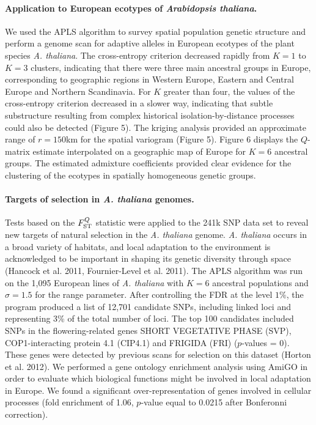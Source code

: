  
\paragraph{Application to European ecotypes of {\it Arabidopsis  thaliana}.} We used  the APLS algorithm to survey spatial population genetic structure and perform a genome scan for adaptive alleles in European ecotypes of the plant species {\it A.  thaliana}. The cross-entropy criterion decreased rapidly from $K=1$ to $K=3$ clusters,  indicating  that  there were three main ancestral groups in Europe, corresponding to geographic regions in Western Europe, Eastern and Central Europe and Northern Scandinavia. For $K$ greater than four, the values of the cross-entropy criterion decreased in a slower way, indicating that subtle substructure resulting from complex historical isolation-by-distance  processes could also be detected (Figure 5). 
The kriging analysis provided an approximate range of  $r = 150$km for the spatial variogram (Figure 5). Figure 6 displays the $Q$-matrix estimate  interpolated on a geographic map of Europe for $K = 6$ ancestral groups. The estimated admixture coefficients provided clear evidence for the clustering of the ecotypes in spatially homogeneous genetic groups. 

\paragraph{Targets of selection in {\it A.  thaliana} genomes.}  Tests based on the $F^Q_{\rm ST}$  statistic were applied to the 241k SNP data set to reveal new targets of natural selection in the {\it A. thaliana} genome. {\it A. thaliana} occurs in a broad variety of habitats, and local adaptation to the environment is acknowledged to be important in shaping its genetic diversity through space (Hancock et al. 2011, Fournier-Level et al. 2011). 
The APLS algorithm was run on the 1,095 European lines of {\it A. thaliana} with $K=6$ ancestral populations and $\sigma = 1.5$ for the range parameter. After controlling the FDR at the level $1\%$, the program produced a list of 12,701 candidate SNPs, including linked loci and representing 3\% of the total number of loci. 
 The top 100 candidates included SNPs in the flowering-related genes SHORT VEGETATIVE PHASE (SVP), COP1-interacting protein 4.1 (CIP4.1) and FRIGIDA (FRI) ($p$-values = 0). These genes were detected by previous scans for selection on this dataset (Horton et al. 2012).
 We performed a gene ontology enrichment analysis using AmiGO in order to evaluate which biological functions might be involved in local adaptation in Europe. 
 We found a significant over-representation of genes involved in cellular processes (fold enrichment of 1.06, $p$-value equal to 0.0215 after Bonferonni correction).


